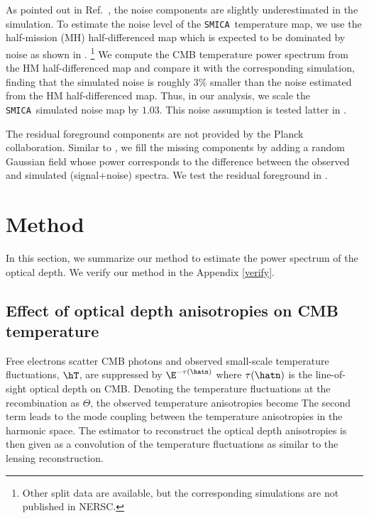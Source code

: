 \documentclass[aps,prd,twocolumn,superscriptaddress,groupedaddress,nofootinbib]{revtex4}
\def\T{\Theta}
\def\SMICA{{\tt SMICA}}
\begin{document}
As pointed out in Ref.~\cite{P15:phi}, the noise components are slightly underestimated in the simulation. 
To estimate the noise level of the \SMICA\ temperature map, we use the half-mission (MH) half-differenced map
which is expected to be dominated by noise as shown in \cite{P15:compsep:cmb}. 
\footnote{Other split data are available, but the corresponding simulations are not published in NERSC.}
We compute the CMB temperature power spectrum from the HM half-differenced map 
and compare it with the corresponding simulation, 
finding that the simulated noise is roughly $3$\% smaller than 
the noise estimated from the HM half-differenced map. 
Thus, in our analysis, we scale the \SMICA\ simulated noise map by $1.03$. 
This noise assumption is tested latter in .

The residual foreground components are not provided by the Planck collaboration. 
Similar to \cite{P15:phi}, we fill the missing components by adding a random Gaussian field 
whose power corresponds to the difference between the observed and simulated (signal+noise) spectra. 
We test the residual foreground in .


\section{Method} \label{analysis}

In this section, we summarize our method to estimate the power spectrum of the optical depth. 
We verify our method in the Appendix \ref{verify}. 

\subsection{Effect of optical depth anisotropies on CMB temperature}

Free electrons scatter CMB photons and observed small-scale temperature fluctuations, $\hT$, are 
suppressed by $\E^{-\tau(\hatn)}$ where $\tau(\hatn)$ is the line-of-sight 
optical depth on CMB. Denoting the temperature fluctuations at the recombination as $\T$, 
the observed temperature anisotropies become
\al{
	\hT(\hatn) &= \E^{-\tau(\hatn)}\T(\hatn) 
		\notag \\
		&= \T(\hatn) - \tau(\hatn)\T(\hatn) + \mC{O}(\tau^2) \,.
}
The second term leads to the mode coupling between the temperature anisotropies in the harmonic space. 
The estimator to reconstruct the optical depth anisotropies is then given as a convolution of 
the temperature fluctuations as similar to the lensing reconstruction. 
\end{document}
